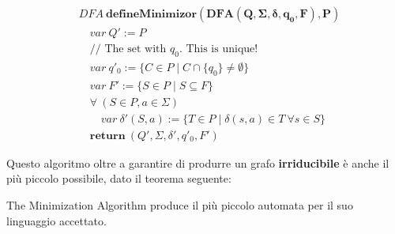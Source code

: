 \begin{align*}
& DFA \ \mathbf{defineMinimizor(DFA(Q,\Sigma,\delta,q_0,F), P)}             \\
& \quad var \ Q' := P                                                       \\
& \quad \text{// The set with } q_0 \text{. This is unique!}                \\
& \quad var \ q'_0 := \{C \in P \mid C \cap \{q_0\} \neq \emptyset\}        \\
& \quad var \ F' := \{S \in P \mid S \subseteq F\}                          \\
& \quad \forall \ (S \in P, a \in \Sigma)                                   \\
& \qquad var \ \delta'(S,a):=\{T\in P\mid\delta(s,a)\in T\ \forall s\in S\} \\
& \quad \mathbf{return} \ (Q',\Sigma,\delta',q'_0,F')
\end{align*}

Questo algoritmo oltre a garantire di produrre un grafo \textbf{irriducibile} è
anche il più piccolo possibile, dato il teorema seguente:

\begin{theorem}
The Minimization Algorithm produce il più piccolo automata per il suo
linguaggio accettato.
\end{theorem}
